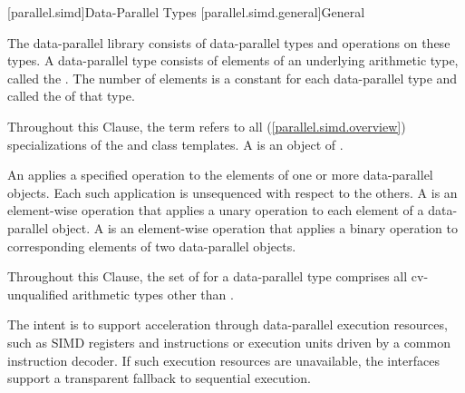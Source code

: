 
\newcommand\foralli[1][]{for all $i$ in the range of \tcode{[0, #1size())}}
\newcommand\forallmaskedi{for all selected indices $i$}
\newcommand\flagsRequires[2]{
\item If the template parameter \tcode{Flags} is \tcode{vector_aligned_tag}, \tcode{mem} shall point to storage aligned by \tcode{memory_alignment_v<#1>}.
\item If the template parameter \tcode{Flags} is \tcode{overaligned_tag<N>}, \tcode{mem} shall point to storage aligned by \tcode{N}.
\item If the template parameter \tcode{Flags} is \tcode{element_aligned_tag}, \tcode{mem} shall point to storage aligned by \tcode{alignof(#2)}.
}

[parallel.simd]{Data-Parallel Types}
[parallel.simd.general]{General}

\pnum
The data-parallel library consists of data-parallel types and operations on these types. A data-parallel type consists of elements of an underlying arithmetic type, called the . The number of elements is a constant for each data-parallel type and called the  of that type.

\pnum
Throughout this Clause, the term  refers to all  (\ref{parallel.simd.overview}) specializations of the  and  class templates. A  is an object of .

\pnum
An  applies a specified operation to the elements of one or more data-parallel objects. Each such application is unsequenced with respect to the others. A  is an element-wise operation that applies a unary operation to each element of a data-parallel object. A  is an element-wise operation that applies a binary operation to corresponding elements of two data-parallel objects.

\pnum
Throughout this Clause, the set of  for a data-parallel type comprises all cv-unqualified arithmetic types other than .

\pnum
\begin{note}
The intent is to support acceleration through data-parallel execution resources, such as SIMD registers and instructions or execution units driven by a common instruction decoder. If such execution resources are unavailable, the interfaces support a transparent fallback to sequential execution.
\end{note}

